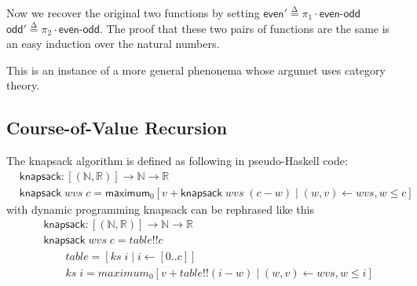 \documentclass[a4paper, UKenglish, cleveref, autoref, thm-restate]{lipics-v2021}
\newcommand{\eqdef}{\stackrel{\mathrm{\Delta}}{=}}
\newcommand{\N}{\mathbb{N}}
\newcommand{\Nat}{\N}
\newcommand{\R}{\mathbb{R}}
\newcommand{\comp}{\cdot}
\newcommand{\operator}[1]{\textsf{#1}}
\begin{document}
Now we recover the original two functions by setting
$\operator{even}' \eqdef \pi_{1} \comp \operator{even-odd}$
$\operator{odd}' \eqdef \pi_{2} \comp \operator{even-odd}$. The proof that these
two pairs of functions are the same is an easy induction over the natural
numbers.

This is an instance of a more general phenonema whose argumet uses category
theory.

\subsection{Course-of-Value Recursion}
The knapsack algorithm is defined as following in pseudo-Haskell code:
\begin{align*}
  & \operator{knapsack} : [(\Nat, \R)] \to \Nat \to \R\\
  & \operator{knapsack}\;wvs\; c = \operator{maximum}_{0}
    [v + \operator{knapsack}\;wvs\; (c - w) \mid (w,v) \leftarrow wvs, w \le c]
\end{align*}
%
with dynamic programming knapsack can be rephrased like this
\begin{align*}
  & \operator{knapsack} : [(\Nat, \R)] \to \Nat \to \R\\
  & \operator{knapsack}\;wvs\;c= table !! c \\
  & \qquad table  = [ks\;i \mid i \leftarrow [0..c]]\\
  & \qquad ks\; i = maximum_{0} [v + table!! (i - w) \mid (w,v) \leftarrow wvs, w \le i]
\end{align*}
\end{document}
